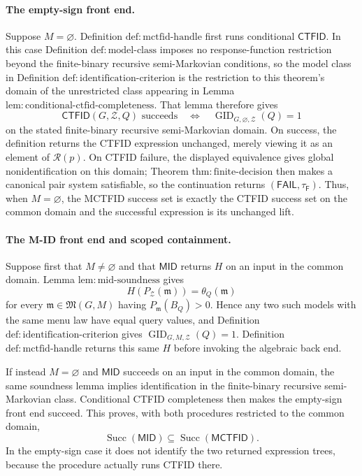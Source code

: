 \paragraph{The empty-sign front end.}
Suppose \(M=\varnothing\).  Definition \(\mathrm{def:mctfid\text{-}handle}\) first runs conditional \(\mathsf{CTFID}\).  In this case Definition \(\mathrm{def:model\text{-}class}\) imposes no response-function restriction beyond the finite-binary recursive semi-Markovian conditions, so the model class in Definition \(\mathrm{def:identification\text{-}criterion}\) is the restriction to this theorem's domain of the unrestricted class appearing in Lemma \(\mathrm{lem:conditional\text{-}ctfid\text{-}completeness}\).  That lemma therefore gives
\[
 \mathsf{CTFID}(G,\mathcal Z,Q)\text{ succeeds}
 \quad\Longleftrightarrow\quad
 \operatorname{GID}_{G,\varnothing,\mathcal Z}(Q)=1
\]
on the stated finite-binary recursive semi-Markovian domain.  On success, the definition returns the CTFID expression unchanged, merely viewing it as an element of \(\mathcal R(p)\).  On CTFID failure, the displayed equivalence gives global nonidentification on this domain; Theorem \(\mathrm{thm:finite\text{-}decision}\) then makes a canonical pair system satisfiable, so the continuation returns \((\mathsf{FAIL},\tau_{\mathsf F})\).  Thus, when \(M=\varnothing\), the MCTFID success set is exactly the CTFID success set on the common domain and the successful expression is its unchanged lift.

\paragraph{The M-ID front end and scoped containment.}
Suppose first that \(M\ne\varnothing\) and that \(\mathsf{MID}\) returns \(H\) on an input in the common domain.  Lemma \(\mathrm{lem:mid\text{-}soundness}\) gives
\[
 H(P_{\mathcal Z}(\mathfrak m))=\theta_Q(\mathfrak m)
\]
for every \(\mathfrak m\in\mathfrak M(G,M)\) having \(P_{\mathfrak m}(B_Q)>0\).  Hence any two such models with the same menu law have equal query values, and Definition \(\mathrm{def:identification\text{-}criterion}\) gives \(\operatorname{GID}_{G,M,\mathcal Z}(Q)=1\).  Definition \(\mathrm{def:mctfid\text{-}handle}\) returns this same \(H\) before invoking the algebraic back end.

If instead \(M=\varnothing\) and \(\mathsf{MID}\) succeeds on an input in the common domain, the same soundness lemma implies identification in the finite-binary recursive semi-Markovian class.  Conditional CTFID completeness then makes the empty-sign front end succeed.  This proves, with both procedures restricted to the common domain,
\[
 \operatorname{Succ}(\mathsf{MID})
 \subseteq \operatorname{Succ}(\mathsf{MCTFID}).
\]
In the empty-sign case it does not identify the two returned expression trees, because the procedure actually runs CTFID there.

